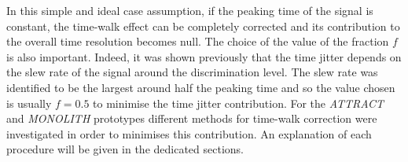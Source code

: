 		In this simple and ideal case assumption, if the peaking time of the signal is constant, the time-walk effect can be completely corrected and its contribution to the overall time resolution becomes null. The choice of the value of the fraction $f$ is also important. Indeed, it was shown previously that the time jitter depends on the slew rate of the signal around the discrimination level. The slew rate was identified to be the largest around half the peaking time and so the value chosen is usually $f = 0.5$ to minimise the time jitter contribution. 
		For the \textit{ATTRACT} and \textit{MONOLITH} prototypes different methods for time-walk correction were investigated in order to minimises this contribution. An explanation of each procedure will be given in the dedicated sections. 
		
